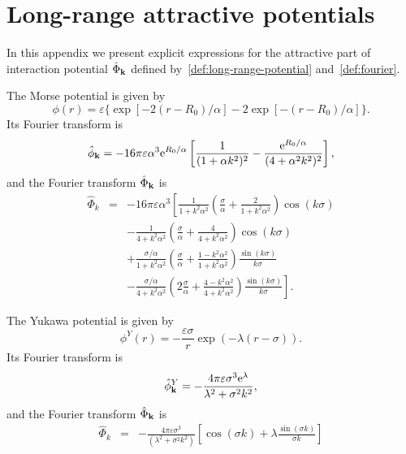 \section{\label{app:potentials}Long-range attractive potentials}
In this appendix we present explicit expressions for the attractive part of interaction potential $\hat{\Phi}_{\vb k}$ defined by~\eqref{def:long-range-potential} and~\eqref{def:fourier}.

The Morse potential is given by
\begin{equation}
	\label{def:morse}
	\phi(r) = \varepsilon \{\exp{[-2(r-R_0)/\alpha]}-2\exp{[-(r-R_0)/\alpha]}\}.
\end{equation}
Its Fourier transform is
\begin{equation*}
	\hat{\phi}_{\vb k} = -16\pi\varepsilon\alpha^3 {\rm e}^{R_0/\alpha} 
	\left[\frac{1}{(1 + \alpha k^2)^2} - \frac{{\rm e}^{R_0/\alpha}}{(4 + \alpha^2 k^2)^2}\right],
\end{equation*}
and the Fourier transform $\hat{\Phi}_{\vb k}$ is
\begin{eqnarray*}
	\label{eq:part_morse_fourier}
	\hat{\Phi}_k &=& -16\pi \varepsilon \alpha^3 
	\left[
	\frac{1}{1+k^2\alpha^2}\left(\frac{\sigma}{\alpha} + \frac{2}{1+k^2\alpha^2}\right) \cos(k\sigma)
	\right.
	\nonumber\\
	&& \left.
	-\frac{1}{4 + k^2\alpha^2} \left(\frac{\sigma}{\alpha} + \frac{4}{4 + k^2\alpha^2}\right) \cos(k\sigma)
	\right.
	\nonumber \\
	&& \left.
	+ \frac{\sigma/\alpha}{1 + k^2\alpha^2} \left(\frac{\sigma}{\alpha} + \frac{1 - k^2\alpha^2}{1 + k^2 \alpha^2}\right) \frac{\sin(k\sigma)}{k\sigma}
	\right.
	\nonumber\\
	&& \left.
	- \frac{\sigma/\alpha}{4 + k^2\alpha^2} \left(2\frac{\sigma}{\alpha} + \frac{4 - k^2\alpha^2}{4 + k^2\alpha^2}\right) \frac{\sin(k\sigma)}{k\sigma}
	\right].
\end{eqnarray*}

The Yukawa potential is given by
\begin{equation}
	\label{def:yukawa}
	\phi^Y(r) = -\frac{\varepsilon \sigma}{r} \exp(-\lambda(r - \sigma)).
\end{equation}
Its Fourier transform is
\begin{equation*}
	\hat{\phi}^Y_{\vb k} = -\frac{4\pi \varepsilon \sigma^3 {\rm e}^{\lambda}}{\lambda^2 + \sigma^2 k^2},
\end{equation*}
and the Fourier transform $\hat{\Phi}_{\vb k}$ is
\begin{eqnarray*}
	\label{eq:part_yukawa_fourier}
	\hat{\Phi}_k & = & -\frac{4\pi \varepsilon\sigma^3}{(\lambda^2 + \sigma^2 k^2)}
	\left[\cos(\sigma k) + \lambda \frac{\sin(\sigma k)}{\sigma k} \right]
\end{eqnarray*}

